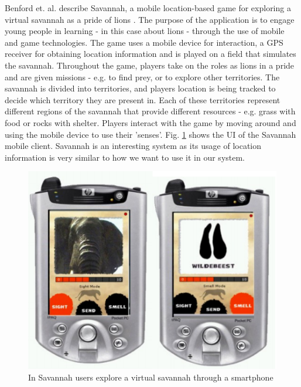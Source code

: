 Benford et. al. describe Savannah, a mobile location-based game for exploring a virtual savannah as a pride of lions \cite{Benford_Rowland_Hull_Reid_Morrison_Facer_Clayton_2004}. The purpose of the application is to engage young people in learning - in this case about lions - through the use of mobile and game technologies. The game uses a mobile device for interaction, a GPS receiver for obtaining location information and is played on a field that simulates the savannah. Throughout the game, players take on the roles as lions in a pride and are given missions - e.g. to find prey, or to explore other territories. The savannah is divided into territories, and players location is being tracked to decide which territory they are present in. Each of these territories represent different regions of the savannah that provide different resources - e.g. grass with food or rocks with shelter. Players interact with the game by moving around and using the mobile device to use their 'senses'. Fig. \ref{fig:savannah} shows the UI of the Savannah mobile client. Savannah is an interesting system as its usage of location information is very similar to how we want to use it in our system.
\\

\begin{figure}
	\centering
	\includegraphics[scale=0.6]{fig/savannah}
	\caption{In Savannah \cite{Benford_Rowland_Hull_Reid_Morrison_Facer_Clayton_2004} users explore a virtual savannah through a smartphone}
	\label{fig:savannah}
\end{figure}

